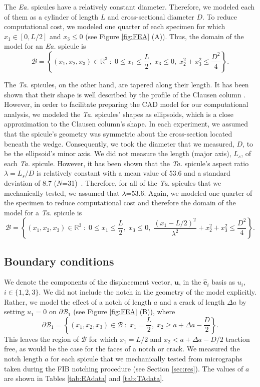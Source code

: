 \documentclass[12pt,onecolumn]{article}
\makeatletter
\newcommand{\ei}{{\bm{\hat{e}}}_i}
\newcommand{\TA}{\textit{Ta.\@}\xspace}
\newcommand{\EA}{\textit{Ea.\@}\xspace}
\makeatother
\begin{document}
\begin{bibunit}
The \EA spicules have a relatively constant diameter. Therefore, we modeled each of them as a cylinder of length $L$ and cross-sectional diameter $D$. To reduce computational cost, we modeled one quarter of each specimen for which $x_1 \in [0,L/2]$ and $x_3\leq 0$ (see Figure \ref{fig:FEA} (A)). Thus, the domain of the model for an \EA spicule is 
%
\[\mathcal{B} = \left\{(x_1,x_2,x_3) \in \mathbb{R}^3 \; : \; 0 \leq x_1 \leq \frac{L}{2}, \; x_3 \leq 0, \; x_2^2+x_3^2\leq \frac{D^2}{4}\right\}.\]

The \TA spicules, on the other hand, are tapered along their length. It has been shown that their shape is well described by the profile of the Clausen column \cite{monn2017new}. However, in order to facilitate preparing the CAD model for our computational analysis, we modeled the \TA spicules' shapes as ellipsoids, which is a close approximation to the Clausen column's shape. In each experiment, we assumed that the spicule's geometry was symmetric about the cross-section located beneath the wedge. Consequently, we took the diameter that we measured, $D$, to be the ellipsoid's minor axis.  We did not measure the length (major axis), $L_s$, of each \TA spicule. However, it has been shown that the \TA spicule's aspect ratio $\lambda=L_s/D$ is relatively constant with a mean value of 53.6 and a standard deviation of 8.7 ($N$=31)~\cite{monn2017new}. Therefore, for all of the \TA spicules that we mechanically tested, we assumed that $\lambda$=53.6. Again, we modeled one quarter of the specimen to reduce computational cost and therefore the domain of the model for a \TA spicule is 
%
\[\mathcal{B} = \left\{(x_1,x_2,x_3) \in \mathbb{R}^3 \; : \; 0 \leq x_1 \leq \frac{L}{2}, \; x_3 \leq 0, \; \frac{(x_1-L/2)^2}{\lambda^2}+x_2^2+x_3^2\leq \frac{D^2}{4}\right\}.\]


\subsection{Boundary conditions}
We denote the components of the displacement vector, $\bm{u}$, in the $\ei$ basis as $u_i$, $i \in \{1,2,3\}$. We did not include the notch in the geometry of the model explicitly. Rather, we model the effect of a notch of length $a$ and a crack of length $\Delta a$ by setting $u_1=0$ on $\partial \mathcal{B}_1$ (see Figure \ref{fig:FEA} (B)), where
\begin{equation}
\label{eq:BC1}
    \partial \mathcal{B}_1=\left\{(x_1,x_2,x_3) \in \mathcal{B} \; : \; x_1=\frac{L}{2}, \; x_2 \geq a+\Delta a-\frac{D}{2}\right\}.
\end{equation}
%
This leaves the region of $\mathcal{B}$ for which $x_1=L/2$ and $x_2 < a+\Delta a-D/2$ traction free, as would be the case for the faces of a notch or crack. We measured the notch length $a$ for each spicule that we mechanically tested from micrographs taken during the FIB notching procedure (see Section \ref{sec:res}). The values of $a$ are shown in Tables \ref{tab:EAdata} and \ref{tab:TAdata}.


\end{bibunit}
\end{document}
